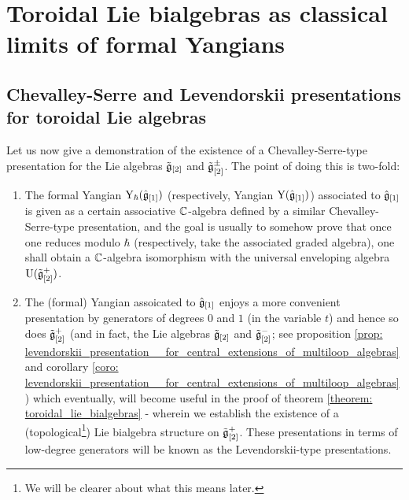 \section{Toroidal Lie bialgebras as classical limits of formal Yangians}
    \subsection{Chevalley-Serre and Levendorskii presentations for toroidal Lie algebras}
        Let us now give a demonstration of the existence of a Chevalley-Serre-type presentation for the Lie algebras $\tilde{\mathfrak{g}}_{[2]}$ and $\tilde{\mathfrak{g}}_{[2]}^{\pm}$. The point of doing this is two-fold:
        \begin{enumerate}
            \item The formal Yangian $\mathrm{Y}_{\hbar}(\hat{\mathfrak{g}}_{[1]})$ (respectively, Yangian $\mathrm{Y}(\hat{\mathfrak{g}}_{[1]})$) associated to $\hat{\mathfrak{g}}_{[1]}$ is given as a certain associative $\mathbb{C}$-algebra defined by a similar Chevalley-Serre-type presentation, and the goal is usually to somehow prove that once one reduces modulo $\hbar$ (respectively, take the associated graded algebra), one shall obtain a $\mathbb{C}$-algebra isomorphism with the universal enveloping algebra $\mathrm{U}(\tilde{\mathfrak{g}}_{[2]}^+)$.
            \item The (formal) Yangian assoicated to $\hat{\mathfrak{g}}_{[1]}$ enjoys a more convenient presentation by generators of degrees $0$ and $1$ (in the variable $t$) and hence so does $\tilde{\mathfrak{g}}_{[2]}^+$ (and in fact, the Lie algebras $\tilde{\mathfrak{g}}_{[2]}$ and $\tilde{\mathfrak{g}}_{[2]}^-$; see proposition \ref{prop: levendorskii_presentation__for_central_extensions_of_multiloop_algebras} and corollary \ref{coro: levendorskii_presentation__for_central_extensions_of_multiloop_algebras}) which eventually, will become useful in the proof of theorem \ref{theorem: toroidal_lie_bialgebras} - wherein we establish the existence of a (topological\footnote{We will be clearer about what this means later.}) Lie bialgebra structure on $\tilde{\mathfrak{g}}_{[2]}^+$. These presentations in terms of low-degree generators will be known as the Levendorskii-type presentations.
        \end{enumerate}

